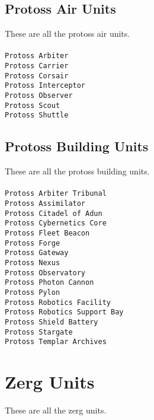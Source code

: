 \subsection{Protoss Air Units}
These are all the protoss air units.
\\\\
\verb|Protoss Arbiter| \\
\verb|Protoss Carrier| \\
\verb|Protoss Corsair| \\
\verb|Protoss Interceptor| \\
\verb|Protoss Observer| \\
\verb|Protoss Scout| \\
\verb|Protoss Shuttle| \\

\subsection{Protoss Building Units}
These are all the protoss building units.
\\\\
\verb|Protoss Arbiter Tribunal| \\
\verb|Protoss Assimilator| \\
\verb|Protoss Citadel of Adun| \\
\verb|Protoss Cybernetics Core| \\
\verb|Protoss Fleet Beacon| \\
\verb|Protoss Forge| \\
\verb|Protoss Gateway| \\
\verb|Protoss Nexus| \\
\verb|Protoss Observatory| \\
\verb|Protoss Photon Cannon| \\
\verb|Protoss Pylon| \\
\verb|Protoss Robotics Facility| \\
\verb|Protoss Robotics Support Bay| \\
\verb|Protoss Shield Battery| \\
\verb|Protoss Stargate| \\
\verb|Protoss Templar Archives| \\

\section{Zerg Units}
These are all the zerg units.

